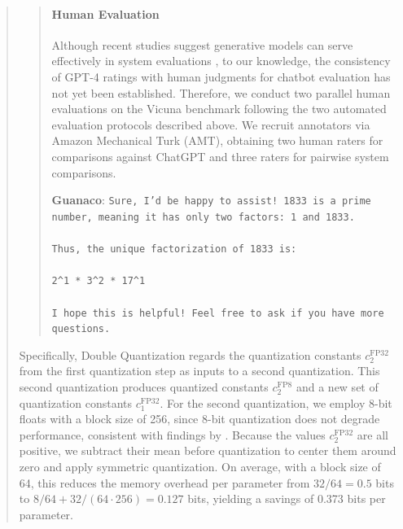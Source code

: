 \begin{quote}
\begin{quote}
\paragraph{Human Evaluation} Although recent studies suggest generative models can serve effectively in system evaluations \citep{fu2023gptscore}, to our knowledge, the consistency of GPT-4 ratings with human judgments for chatbot evaluation has not yet been established. Therefore, we conduct two parallel human evaluations on the Vicuna benchmark following the two automated evaluation protocols described above. We recruit annotators via Amazon Mechanical Turk (AMT), obtaining two human raters for comparisons against ChatGPT and three raters for pairwise system comparisons.

    \textbf{Guanaco}: \texttt{Sure, I'd be happy to assist! 1833 is a prime number, meaning it has only two factors: 1 and 1833. \\ \\ Thus, the unique factorization of 1833 is: \\ \\ 2\^{}1 * 3\^{}2 * 17\^{}1 \\ \\ I hope this is helpful! Feel free to ask if you have more questions.}
\end{quote}

Specifically, Double Quantization regards the quantization constants $c_2^{\text{FP32}}$ from the first quantization step as inputs to a second quantization. This second quantization produces quantized constants $c_2^{\text{FP8}}$ and a new set of quantization constants $c_1^{\text{FP32}}$. For the second quantization, we employ 8-bit floats with a block size of 256, since 8-bit quantization does not degrade performance, consistent with findings by \citet{dettmers2022case}. Because the values $c_2^{\text{FP32}}$ are all positive, we subtract their mean before quantization to center them around zero and apply symmetric quantization. On average, with a block size of 64, this reduces the memory overhead per parameter from $32/64=0.5$ bits to $8/64 + 32/(64 \cdot 256) = 0.127$ bits, yielding a savings of 0.373 bits per parameter.


\end{quote}
